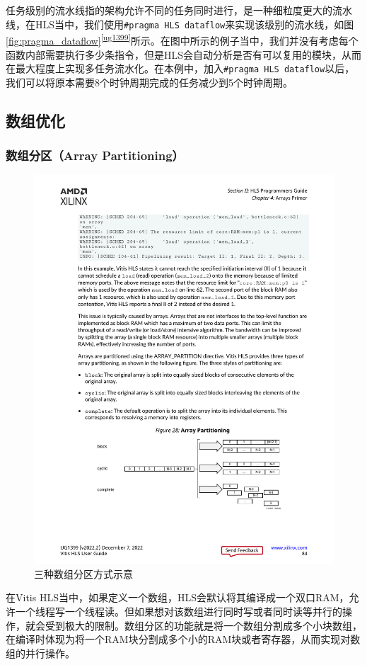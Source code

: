 任务级别的流水线指的架构允许不同的任务同时进行，是一种细粒度更大的流水线，在HLS当中，我们使用\verb|#pragma HLS dataflow|来实现该级别的流水线，如图\ref{fig:pragma_dataflow}\textsuperscript{\ref {ug1399}}所示。在图中所示的例子当中，我们并没有考虑每个函数内部需要执行多少条指令，但是HLS会自动分析是否有可以复用的模块，从而在最大程度上实现多任务流水化。在本例中，加入\verb|#pragma HLS dataflow|以后，我们可以将原本需要8个时钟周期完成的任务减少到5个时钟周期。

\subsection{数组优化}
\subsubsection{数组分区（Array Partitioning）}
\begin{figure}[htbp]
    \centering
    \includegraphics[width=\linewidth]{figures/array_partitioning.pdf}
    \caption{三种数组分区方式示意}
    \label{fig:array_partitioning}
\end{figure}
在Vitis HLS当中，如果定义一个数组，HLS会默认将其编译成一个双口RAM，允许一个线程写一个线程读。但如果想对该数组进行同时写或者同时读等并行的操作，就会受到极大的限制。数组分区的功能就是将一个数组分割成多个小块数组，在编译时体现为将一个RAM块分割成多个小的RAM块或者寄存器，从而实现对数组的并行操作。


